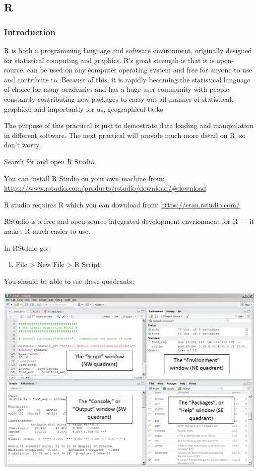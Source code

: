 \documentclass[]{book}
\providecommand{\tightlist}{%
  \setlength{\itemsep}{0pt}\setlength{\parskip}{0pt}}
\begin{document}
\hypertarget{r}{%
\subsection{R}\label{r}}

\hypertarget{introduction-2}{%
\subsubsection{Introduction}\label{introduction-2}}

R is both a programming language and software environment, originally designed for statistical computing and graphics. R's great strength is that it is open-source, can be used on any computer operating system and free for anyone to use and contribute to. Because of this, it is rapidly becoming the statistical language of choice for many academics and has a huge user community with people constantly contributing new packages to carry out all manner of statistical, graphical and importantly for us, geographical tasks.

The purpose of this practical is just to demostrate data loading and manipulation in different software. The next practical will provide much more detail on R, so don't worry.

Search for and open R Studio.

You can install R Studio on your own machine from: \url{https://www.rstudio.com/products/rstudio/download/\#download}

R studio requires R which you can download from: \url{https://cran.rstudio.com/}

RStudio is a free and open-source integrated development envrionment for R --- it makes R much easier to use.

In RStduio go:

\begin{enumerate}
\def\labelenumi{\arabic{enumi}.}
\tightlist
\item
  File \textgreater{} New File \textgreater{} R Script
\end{enumerate}

You should be able to see these quadrants:

\begin{center}\includegraphics[width=800pt]{prac1_images/RStudio} \end{center}
\end{document}
